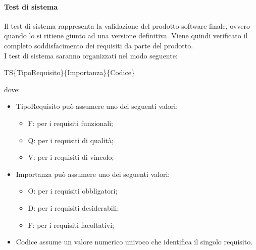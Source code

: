 \paragraph{Test di sistema}
Il test di sistema rappresenta la validazione del prodotto software finale, ovvero quando lo si
ritiene giunto ad una versione definitiva. Viene quindi verificato il completo soddisfacimento dei
requisiti da parte del prodotto.\\
I test di sistema saranno organizzati nel modo seguente: \\
\begin{center}TS\{TipoRequisito\}\{Importanza\}\{Codice\}\end{center}
dove:
\begin{itemize}
	\item TipoRequisito può assumere uno dei seguenti valori:
	\begin{itemize}
		\item F: per i requisiti funzionali;
		\item Q: per i requisiti di qualità;
		\item V: per i requisiti di vincolo;
	\end{itemize}
	\item Importanza può assumere uno dei seguenti valori:
	\begin{itemize}
		\item O: per i requisiti obbligatori;
		\item D: per i requisiti desiderabili;
		\item F: per i requisiti facoltativi;
	\end{itemize}
	\item Codice assume un valore numerico univoco che identifica il singolo requisito.
\end{itemize}
